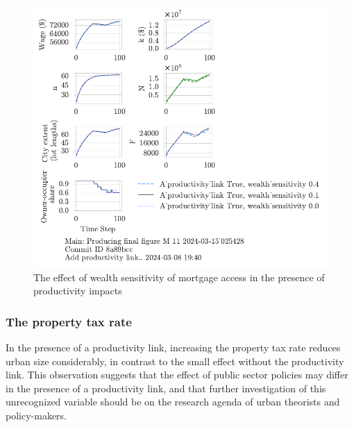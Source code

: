 {\begin{figure}[h!bt]
    \centering
    \includegraphics[scale=.8, trim={0 1.4cm 0 0},clip]{fig/With-productivity_link-wealth_sensitivity-025428.pdf}
    \caption{The effect of wealth sensitivity of mortgage access in the presence of productivity impacts}
    \label{fig:Productivity_link_and_wealth_sensitivity_ownership_trajectory}
\end{figure}

\newpage

\subsubsection{The property tax rate}

In the presence of a productivity link, increasing the property tax rate reduces urban size considerably, in contrast to the small effect without the productivity link. This observation suggests that the effect of public sector policies may differ in the presence of a productivity link, and that further investigation of this unrecognized variable should be on the research agenda of urban theorists and policy-makers.

}
